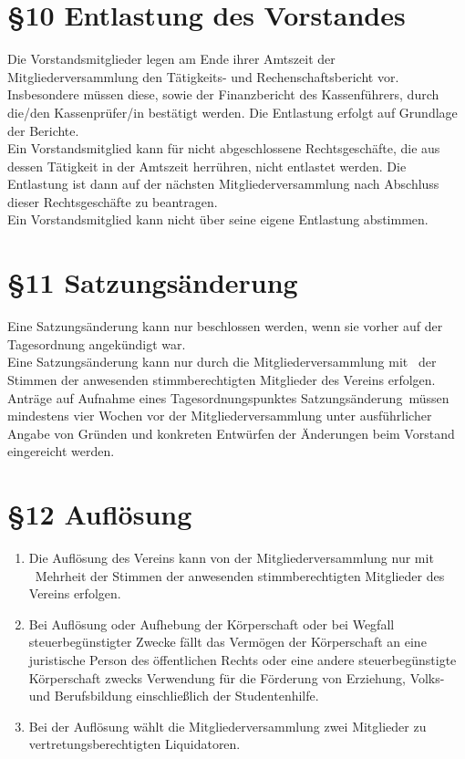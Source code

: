 \documentclass[11pt,ngerman]{article}
\begin{document}
\section*{§10 Entlastung des Vorstandes}
Die Vorstandsmitglieder legen am Ende ihrer Amtszeit der Mitgliederversammlung den Tätigkeits- und Rechenschaftsbericht vor.
Insbesondere müssen diese, sowie der Finanzbericht des Kassenführers, durch die/den Kassenprüfer/in bestätigt werden.
Die Entlastung erfolgt auf Grundlage der Berichte.\\
Ein Vorstandsmitglied kann für nicht abgeschlossene Rechtsgeschäfte, die aus dessen Tätigkeit in der Amtszeit herrühren, nicht entlastet werden. Die Entlastung ist dann auf der nächsten Mitgliederversammlung nach Abschluss dieser Rechtsgeschäfte zu beantragen.\\
Ein Vorstandsmitglied kann nicht über seine eigene Entlastung abstimmen.

\section*{§11 Satzungsänderung}
Eine Satzungsänderung kann nur beschlossen werden, wenn sie vorher auf der Tagesordnung angekündigt war.\\
Eine Satzungsänderung kann nur durch die Mitgliederversammlung mit \ der Stimmen der anwesenden stimmberechtigten Mitglieder des Vereins erfolgen.\\
Anträge auf Aufnahme eines Tagesordnungspunktes \glqq Satzungsänderung\grqq\ müssen mindestens vier Wochen vor der Mitgliederversammlung unter ausführlicher Angabe von Gründen und konkreten Entwürfen der Änderungen beim Vorstand eingereicht werden.


\section*{§12 Auflösung}
\begin{enumerate}
 \item Die Auflösung des Vereins kann von der Mitgliederversammlung nur mit \ Mehrheit der Stimmen der anwesenden stimmberechtigten Mitglieder des Vereins erfolgen.
 \item Bei Auflösung oder Aufhebung der Körperschaft oder bei Wegfall steuerbegünstigter Zwecke fällt das Vermögen der Körperschaft an eine juristische Person des öffentlichen Rechts oder eine andere steuerbegünstigte Körperschaft zwecks Verwendung für die Förderung von Erziehung, Volks- und Berufsbildung einschließlich der Studentenhilfe.
 \item Bei der Auflösung wählt die Mitgliederversammlung zwei Mitglieder zu vertretungsberechtigten Liquidatoren.
\end{enumerate}
\end{document}
